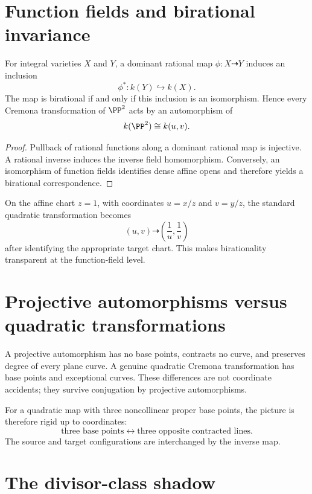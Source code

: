 \section{Function fields and birational invariance}

\begin{proposition}\label{prop:vi44-function-field}
For integral varieties \(X\) and \(Y\), a dominant rational map \(\phi:X\dashrightarrow Y\) induces an inclusion
\[
  \phi^*:k(Y)\hookrightarrow k(X).
\]
The map is birational if and only if this inclusion is an isomorphism.  Hence every Cremona transformation of \(\PP^2\) acts by an automorphism of
\[
  k(\PP^2)\cong k(u,v).
\]
\end{proposition}

\begin{proof}
Pullback of rational functions along a dominant rational map is injective.  A rational inverse induces the inverse field homomorphism.  Conversely, an isomorphism of function fields identifies dense affine opens and therefore yields a birational correspondence.
\end{proof}

On the affine chart \(z=1\), with coordinates \(u=x/z\) and \(v=y/z\), the standard quadratic transformation becomes
\[
  (u,v)\dashrightarrow\left(\frac1u,\frac1v\right)
\]
after identifying the appropriate target chart.  This makes birationality transparent at the function-field level.

\section{Projective automorphisms versus quadratic transformations}

A projective automorphism has no base points, contracts no curve, and preserves degree of every plane curve.  A genuine quadratic Cremona transformation has base points and exceptional curves.  These differences are not coordinate accidents; they survive conjugation by projective automorphisms.

For a quadratic map with three noncollinear proper base points, the picture is therefore rigid up to coordinates:
\[
  \text{three base points}
  \longleftrightarrow
  \text{three opposite contracted lines}.
\]
The source and target configurations are interchanged by the inverse map.

\section{The divisor-class shadow}

